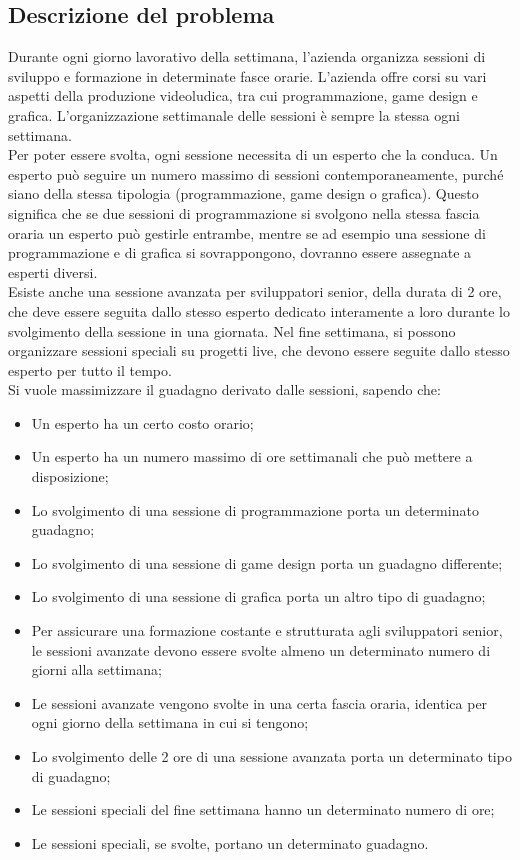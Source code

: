 \documentclass[12pt]{article}
\begin{document}
    \subsection{Descrizione del problema}
    Durante ogni giorno lavorativo della settimana, l'azienda organizza sessioni di sviluppo e formazione in determinate fasce orarie. L'azienda offre corsi su vari aspetti della produzione videoludica, tra cui programmazione, game design e grafica. L'organizzazione settimanale delle sessioni è sempre la stessa ogni settimana.\\
    Per poter essere svolta, ogni sessione necessita di un esperto che la conduca. Un esperto può seguire un numero massimo di sessioni contemporaneamente, purché siano della stessa tipologia (programmazione, game design o grafica). Questo significa che se due sessioni di programmazione si svolgono nella stessa fascia oraria un esperto può gestirle entrambe, mentre se ad esempio una sessione di programmazione e di grafica si sovrappongono, dovranno essere assegnate a esperti diversi.\\
    Esiste anche una sessione avanzata per sviluppatori senior, della durata di 2 ore, che deve essere seguita dallo stesso esperto dedicato interamente a loro durante lo svolgimento della sessione in una giornata. Nel fine settimana, si possono organizzare sessioni speciali su progetti live, che devono essere seguite dallo stesso esperto per tutto il tempo.\\
    Si vuole massimizzare il guadagno derivato dalle sessioni, sapendo che:
    \begin{itemize}
        \item Un esperto ha un certo costo orario;
        \item Un esperto ha un numero massimo di ore settimanali che può mettere a disposizione;
        \item Lo svolgimento di una sessione di programmazione porta un determinato guadagno;
        \item Lo svolgimento di una sessione di game design porta un guadagno differente;
        \item Lo svolgimento di una sessione di grafica porta un altro tipo di guadagno;
        \item Per assicurare una formazione costante e strutturata agli sviluppatori senior, le sessioni avanzate devono essere svolte almeno un determinato numero di giorni alla settimana;
        \item Le sessioni avanzate vengono svolte in una certa fascia oraria, identica per ogni giorno della settimana in cui si tengono;
        \item Lo svolgimento delle 2 ore di una sessione avanzata porta un determinato tipo di guadagno;
        \item Le sessioni speciali del fine settimana hanno un determinato numero di ore;
        \item Le sessioni speciali, se svolte, portano un determinato guadagno.
    \end{itemize}
\end{document}
